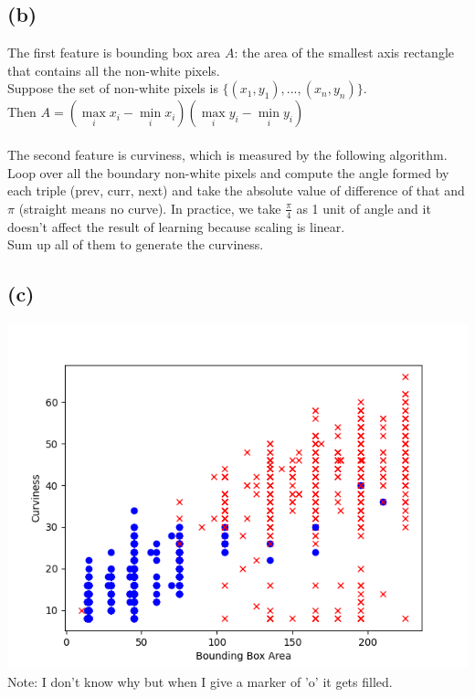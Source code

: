\documentclass{article}
\begin{document}
	\subsection*{(b)}
		The first feature is bounding box area $A$: the area of the smallest axis rectangle that contains all the non-white pixels.\\
		Suppose the set of non-white pixels is $\{(x_1, y_1), ..., (x_n, y_n)\}$.\\
		Then $A = (\max\limits_ix_i - \min\limits_ix_i)(\max\limits_iy_i - \min\limits_iy_i)$\\\\
		The second feature is curviness, which is measured by the following algorithm.\\
		Loop over all the boundary non-white pixels and compute the angle formed by each triple (prev, curr, next) and take the absolute value of  difference of that and $\pi$ (straight means no curve). In practice, we take $\frac \pi 4$ as 1 unit of angle and it doesn't affect the result of learning because scaling is linear.\\
		Sum up all of them to generate the curviness.
	\subsection*{(c)}
		\includegraphics[scale=0.9]{6c.png}\\
		Note: I don't know why but when I give a marker of 'o' it gets filled.
\end{document}
